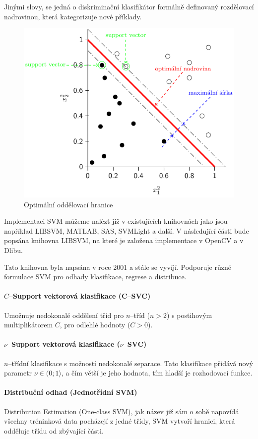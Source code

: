 Jinými slovy, se jedná o diskriminační klasifikátor formálně definovaný rozdělovací nadrovinou, která kategorizuje nové příklady.
\begin{figure}[H]
\centering
\includegraphics[width=.7\linewidth]{figures/svm.pdf}
\caption{Optimální oddělovací hranice}
\label{fig:svm}
\end{figure}

Implementaci SVM můžeme nalézt již v existujících knihovnách jako jsou například LIBSVM, MATLAB, SAS, SVMLight a další. V následující části bude popsána knihovna LIBSVM, na které je založena implementace v OpenCV a v Dlibu.  

Tato knihovna byla napsána v roce 2001 \cite{libsvm} a stále se vyvíjí. Podporuje různé formulace SVM pro odhady klasifikace, regrese a distribuce.

\paragraph*{$C$--Support vektorová klasifikace (C--SVC)} 
Umožnuje nedokonalé oddělení tříd pro $n$--tříd ($n > 2$) s postihovým multiplikátorem $C$, pro odlehlé hodnoty ($C > 0$). \cite{csvmclass}

\paragraph*{$\nu$--Support vektorová klasifikace ($\nu$--SVC)} 
$n$--třídní klasifikace s možností nedokonalé separace. Tato klasifikace přidává nový parametr $\nu \in (0;1\rangle$, a čím větší je jeho hodnota, tím hladší je rozhodovací funkce. \cite{nusvmsvrclass}

\paragraph*{Distribuční odhad (Jednotřídní SVM)} 
Distribution Estimation (One-class SVM), jak název již sám o sobě napovídá všechny tréninková data pocházejí z jedné třídy, SVM vytvoří hranici, která odděluje třídu od zbývající části. \cite{oneclasssvm}

